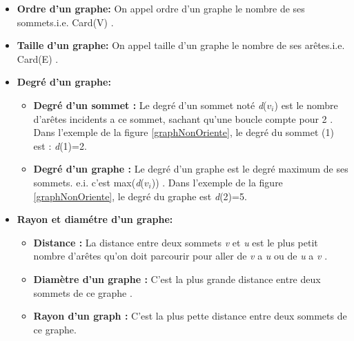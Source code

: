 		\begin{itemize}
			\item 	\textbf{Ordre d'un graphe:} On appel ordre d’un 					graphe le nombre de ses sommets.i.e. Card(V) \citep{DUT}.
			
			\item 	\textbf{Taille d'un graphe:} On appel taille d’un 				graphe le nombre de ses arêtes.i.e. Card(E) \citep{DUT}.
			
			\item \textbf{Degré d'un graphe:}
				\begin{itemize}
					\item \textbf{Degré d'un sommet : } Le degré d’un sommet 					noté \textit{d}($\textit{v}_{i}$) est le nombre 					d'arêtes incidents a ce sommet, sachant qu’une boucle 			compte pour 2 \citep{muller} . Dans l'exemple de la figure \ref{graphNonOriente}, le 					degré du sommet (1) est : \textit{d}(1)=2.
					
					\item \textbf{Degré d'un graphe : }Le degré d’un graphe est 			le degré maximum de ses sommets. e.i. c’est 						max(\textit{d}($\textit{v}_{i}$)) \citep{muller}. Dans l’exemple de 				la figure \ref{graphNonOriente}, le degré du graphe est \textit{d}(2)=5.
				\end{itemize}
				
				
			\item \textbf{Rayon et diamétre d'un graphe: }
				\begin{itemize}
					\item 	\textbf{Distance : }La distance entre deux sommets 					\textit{v} et \textit{u} est le plus petit nombre 					d’arêtes qu’on doit parcourir pour aller de 						\textit{v} a \textit{u} ou de \textit{u} a 							\textit{v} \citep{muller}. 
					
					\item \textbf{Diamètre d’un graphe :} C’est la plus grande 				distance entre deux sommets de ce graphe 							\citep{muller}. 
					
					\item 
			\textbf{Rayon d’un graph : }C’est la plus pette 					distance entre deux sommets de ce graphe.
			
				\end{itemize}
		
		\end{itemize}
		
		
	